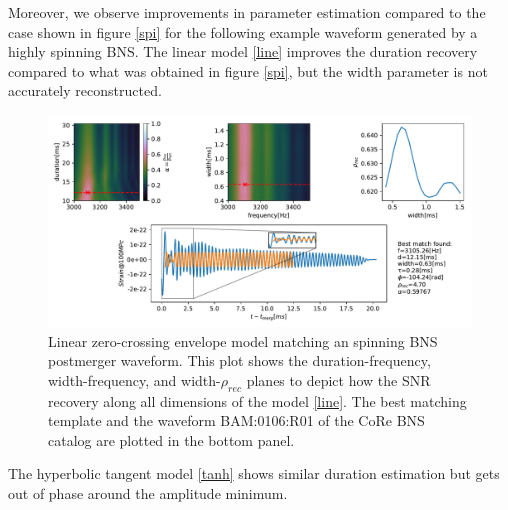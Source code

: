 \FloatBarrier

\newpage
Moreover, we observe improvements in parameter estimation compared to the case shown in figure \ref{spi} for the following example waveform generated by a highly spinning BNS. The linear model \ref{line} improves the duration recovery compared to what was obtained in figure \ref{spi},  but the width parameter is not accurately reconstructed.

\begin{figure}[hbt!]
\begin{center}
\includegraphics[width=\textwidth, angle=0]{images/Data_analysis/results/envel_110_lin.pdf}
\captionsetup{width=0.8\textwidth}
\caption[Linear zero-crossing envelope model matching a spinning BNS postmerger waveform]{Linear zero-crossing envelope model matching an spinning BNS postmerger waveform. This plot shows the duration-frequency, width-frequency, and width-$\rho_{rec}$ planes to depict how the SNR recovery along all dimensions of the model \ref{line}. The best matching template and the waveform BAM:0106:R01 of the CoRe BNS catalog \cite{Dietrich:2018phi} are plotted in the bottom panel.}
\end{center}
\end{figure}

\FloatBarrier

The hyperbolic tangent model \ref{tanh} shows similar duration estimation but gets out of phase around the amplitude minimum.

